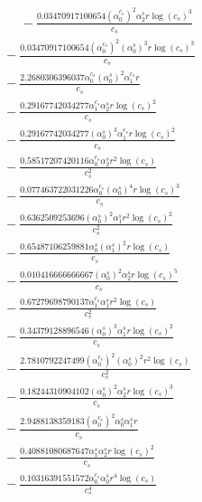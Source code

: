 \documentclass[10pt]{article}
\begin{document}
\begin{align*}
\phantom{R_{0,6}} &\phantom{={}}{}  - \frac{0.03470917100654 \left(\alpha_{0}^{c_s}\right)^{2} \alpha_{2}^s r \log{\left(c_{s} \right)}^{3}}{c_{s}} \\
&{}  - \frac{0.03470917100654 \left(\alpha_{0}^{c_s}\right)^{2} \left(\alpha_{0}^s\right)^{3} r \log{\left(c_{s} \right)}^{3}}{c_{s}} \\
&{}  - \frac{2.2680306396037 \alpha_{0}^{c_s} \left(\alpha_{0}^s\right)^{2} \alpha_{1}^{c_s} r}{c_{s}} \\
&{}  - \frac{0.29167742034277 \alpha_{1}^{c_s} \alpha_{2}^s r \log{\left(c_{s} \right)}^{2}}{c_{s}} \\
&{}  - \frac{0.29167742034277 \left(\alpha_{0}^s\right)^{3} \alpha_{1}^{c_s} r \log{\left(c_{s} \right)}^{2}}{c_{s}} \\
&{}  - \frac{0.58517207420116 \alpha_{0}^{c_s} \alpha_{2}^s r^{2} \log{\left(c_{s} \right)}}{c_{s}^{2}} \\
&{}  - \frac{0.077463722031226 \alpha_{0}^{c_s} \left(\alpha_{0}^s\right)^{4} r \log{\left(c_{s} \right)}^{3}}{c_{s}} \\
&{}  - \frac{0.6362509253696 \left(\alpha_{0}^s\right)^{2} \alpha_{1}^s r^{2} \log{\left(c_{s} \right)}^{2}}{c_{s}^{2}} \\
&{}  - \frac{0.65487106259881 \alpha_{0}^s \left(\alpha_{1}^s\right)^{2} r \log{\left(c_{s} \right)}}{c_{s}} \\
&{}  - \frac{0.010416666666667 \left(\alpha_{0}^s\right)^{2} \alpha_{2}^s r \log{\left(c_{s} \right)}^{5}}{c_{s}} \\
&{}  - \frac{0.67279698790137 \alpha_{1}^{c_s} \alpha_{1}^s r^{2} \log{\left(c_{s} \right)}}{c_{s}^{2}} \\
&{}  - \frac{0.34379128896546 \left(\alpha_{0}^s\right)^{3} \alpha_{1}^s r \log{\left(c_{s} \right)}^{2}}{c_{s}} \\
&{}  - \frac{2.7810792247499 \left(\alpha_{0}^{c_s}\right)^{2} \left(\alpha_{0}^s\right)^{2} r^{2} \log{\left(c_{s} \right)}}{c_{s}^{2}} \\
&{}  - \frac{0.18244310904102 \left(\alpha_{0}^s\right)^{2} \alpha_{2}^s r \log{\left(c_{s} \right)}^{3}}{c_{s}} \\
&{}  - \frac{2.9488138359183 \left(\alpha_{0}^{c_s}\right)^{2} \alpha_{0}^s \alpha_{1}^s r}{c_{s}} \\
&{}  - \frac{0.40881080687647 \alpha_{1}^s \alpha_{2}^s r \log{\left(c_{s} \right)}^{2}}{c_{s}} \\
&{}  - \frac{0.10316391551572 \alpha_{0}^{c_s} \alpha_{0}^s r^{4} \log{\left(c_{s} \right)}}{c_{s}^{4}} \\

\end{align*}
\end{document}
